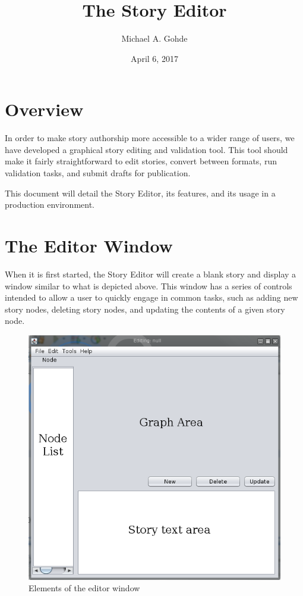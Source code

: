 \documentclass[12pt,letterpaper]{article}
\begin{document}
\title{The Story Editor}
\author{Michael A. Gohde}
\date{April 6, 2017}
\maketitle

\section{Overview}
In order to make story authorship more accessible to a wider range of users, we have developed a graphical story editing and validation tool.
This tool should make it fairly straightforward to edit stories, convert between formats, run validation tasks, and submit drafts for publication.

This document will detail the Story Editor, its features, and its usage in a production environment.

\section{The Editor Window}

When it is first started, the Story Editor will create a blank story and display a window similar to what is depicted above. 
This window has a series of controls intended to allow a user to quickly engage in common tasks, such as adding new story nodes, deleting story nodes, and updating the contents of a given story node.

\begin{figure}
    \begin{center}
        \includegraphics[scale=1]{emptywindow_with_labels.png}
    \end{center}
    \caption{Elements of the editor window}
\end{figure}
\end{document}
